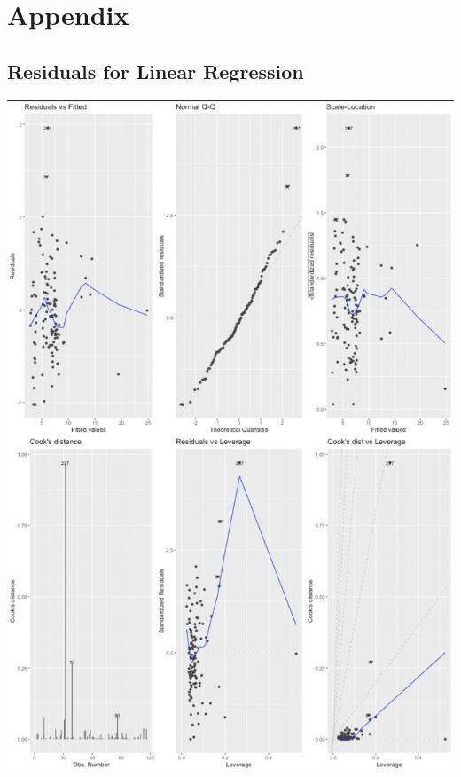 \documentclass{article}
\begin{document}
\section{Appendix}

\subsection{Residuals for Linear Regression}
	\begin{center}
		\includegraphics[width=1\textwidth]{assets/residual1.png}
	\end{center}
\end{document}
